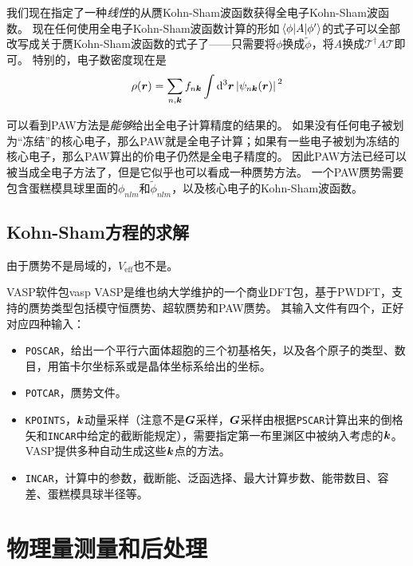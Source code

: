 我们现在指定了一种\emph{线性}的从赝Kohn-Sham波函数获得全电子Kohn-Sham波函数。
现在任何使用全电子Kohn-Sham波函数计算的形如$\mel{\phi}{A}{\phi'}$的式子可以全部改写成关于赝Kohn-Sham波函数的式子了——只需要将$\phi$换成$\tilde{\phi}$，将$A$换成$\mathcal{T}^\dagger A \mathcal{T}$即可。
特别的，电子数密度现在是
\begin{equation}
    \rho(\vb*{r}) = \sum_{n, \vb*{k}} f_{n \vb*{k}} \int \dd[3]{\vb*{r}} \abs*{\psi_{n \vb*{k}}(\vb*{r})}^2  %
\end{equation}

可以看到PAW方法是\emph{能够}给出全电子计算精度的结果的。
如果没有任何电子被划为“冻结”的核心电子，那么PAW就是全电子计算；如果有一些电子被划为冻结的核心电子，那么PAW算出的价电子仍然是全电子精度的。
因此PAW方法已经可以被当成全电子方法了，但是它似乎也可以看成一种赝势方法。
一个PAW赝势需要包含蛋糕模具球里面的$\phi_{nlm}$和$\tilde{\phi}_{nlm}$，以及核心电子的Kohn-Sham波函数。

\subsection{Kohn-Sham方程的求解}

由于赝势不是局域的，$V_\text{eff}$也不是。

\begin{info}{VASP软件包}{vasp}
    VASP是维也纳大学维护的一个商业DFT包，基于PWDFT，支持的赝势类型包括模守恒赝势、超软赝势和PAW赝势。
    其输入文件有四个，正好对应四种输入：
    \begin{itemize}
        \item \texttt{POSCAR}，给出一个平行六面体超胞的三个初基格矢，以及各个原子的类型、数目，用笛卡尔坐标系或是晶体坐标系给出的坐标。
        \item \texttt{POTCAR}，赝势文件。
        \item \texttt{KPOINTS}，$\vb*{k}$动量采样（注意不是$\vb*{G}$采样，$\vb*{G}$采样由根据\texttt{PSCAR}计算出来的倒格矢和\texttt{INCAR}中给定的截断能规定），需要指定第一布里渊区中被纳入考虑的$\vb*{k}$。VASP提供多种自动生成这些$\vb*{k}$点的方法。
        \item \texttt{INCAR}，计算中的参数，截断能、泛函选择、最大计算步数、能带数目、容差、蛋糕模具球半径等。
    \end{itemize}
\end{info}

\section{物理量测量和后处理}

